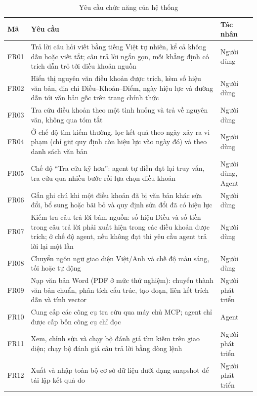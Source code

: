 \begin{table}[H]
\centering
\caption{Yêu cầu chức năng của hệ thống}
\label{tab:yc-chucnang}
\footnotesize
\begin{tabularx}{\textwidth}{@{}l X l@{}}
\toprule
\textbf{Mã} & \textbf{Yêu cầu} & \textbf{Tác nhân} \\
\midrule
FR01 & Trả lời câu hỏi viết bằng tiếng Việt tự nhiên, kể cả không dấu hoặc viết tắt; câu trả lời ngắn gọn, mỗi khẳng định có trích dẫn trỏ tới điều khoản nguồn & Người dùng \\
FR02 & Hiển thị nguyên văn điều khoản được trích, kèm số hiệu văn bản, địa chỉ Điều--Khoản--Điểm, ngày hiệu lực và đường dẫn tới văn bản gốc trên trang chính thức & Người dùng \\
FR03 & Tra cứu điều khoản theo một tình huống và trả về nguyên văn, không qua tóm tắt & Người dùng \\
FR04 & Ở chế độ tìm kiếm thường, lọc kết quả theo ngày xảy ra vi phạm (chỉ giữ quy định còn hiệu lực vào ngày đó) và theo danh sách văn bản & Người dùng \\
FR05 & Chế độ ``Tra cứu kỹ hơn'': agent tự diễn đạt lại truy vấn, tra cứu qua nhiều bước rồi lựa chọn điều khoản & Người dùng, Agent \\
FR06 & Gắn ghi chú khi một điều khoản đã bị văn bản khác sửa đổi, bổ sung hoặc bãi bỏ và quy định sửa đổi đã có hiệu lực & Người dùng \\
FR07 & Kiểm tra câu trả lời bám nguồn: số hiệu Điều và số tiền trong câu trả lời phải xuất hiện trong các điều khoản được trích; ở chế độ agent, nếu không đạt thì yêu cầu agent trả lời lại một lần & Người dùng \\
FR08 & Chuyển ngôn ngữ giao diện Việt/Anh và chế độ màu sáng, tối hoặc tự động & Người dùng \\
FR09 & Nạp văn bản Word (PDF ở mức thử nghiệm): chuyển thành văn bản chuẩn, phân tích cấu trúc, tạo đoạn, liên kết trích dẫn và tính vector & Người phát triển \\
FR10 & Cung cấp các công cụ tra cứu qua máy chủ MCP; agent chỉ được cấp bốn công cụ chỉ đọc & Agent \\
FR11 & Xem, chỉnh sửa và chạy bộ đánh giá tìm kiếm trên giao diện; chạy bộ đánh giá câu trả lời bằng dòng lệnh & Người phát triển \\
FR12 & Xuất và nhập toàn bộ cơ sở dữ liệu dưới dạng snapshot để tái lập kết quả đo & Người phát triển \\
\bottomrule
\end{tabularx}
\end{table}

